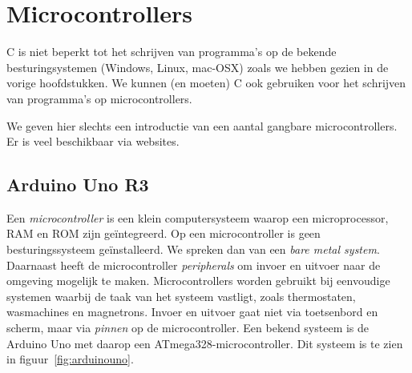 \chapter{Microcontrollers}
\label{cha:microcontrollers}

C is niet beperkt tot het schrijven van programma's op de bekende besturingsystemen (Windows, Linux, mac-OSX) zoals we hebben gezien in de vorige hoofdstukken. We kunnen (en moeten) C ook gebruiken voor het schrijven van programma's op microcontrollers.

We geven hier slechts een introductie van een aantal gangbare microcontrollers. Er is veel beschikbaar via websites.



\section{Arduino Uno R3}
Een \textsl{microcontroller} is een klein computersysteem waarop een microprocessor, RAM en ROM zijn ge\"integreerd. Op een microcontroller is geen besturingssysteem ge\"installeerd. We spreken dan van een \textsl{bare metal system}. Daarnaast heeft de microcontroller \textsl{peripherals} om invoer en uitvoer naar de omgeving mogelijk te maken. Microcontrollers worden gebruikt bij eenvoudige systemen waarbij de taak van het systeem vastligt, zoals thermostaten, wasmachines en magnetrons. Invoer en uitvoer gaat niet via toetsenbord en scherm, maar via \textsl{pinnen} op de microcontroller. Een bekend systeem is de Arduino Uno met daarop een ATmega328-microcontroller. Dit systeem is te zien in figuur~\ref{fig:arduinouno}.


